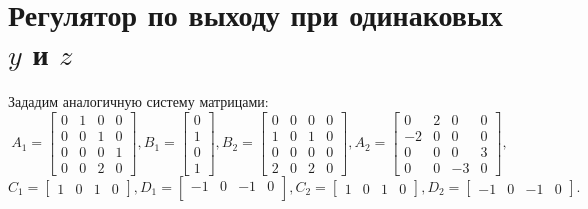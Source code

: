 \pagebreak

\section{Регулятор по выходу при одинаковых $y$ и $z$}

Зададим аналогичную систему матрицами:
\begin{equation*}
    A_1 = \begin{bmatrix}
        0 & 1 & 0 & 0 \\
        0 & 0 & 1 & 0 \\
        0 & 0 & 0 & 1 \\
        0 & 0 & 2 & 0
    \end{bmatrix}, 
    B_1 = \begin{bmatrix}
        0 \\ 1 \\ 0 \\ 1
    \end{bmatrix},
    B_2 = \begin{bmatrix}
        0 & 0 & 0 & 0 \\
        1 & 0 & 1 & 0 \\
        0 & 0 & 0 & 0 \\
        2 & 0 & 2 & 0
    \end{bmatrix}, 
    A_2 = \begin{bmatrix}
        0 & 2 & 0 & 0 \\
        -2 & 0 & 0 & 0 \\
        0 & 0 & 0 & 3 \\
        0 & 0 & -3 & 0
    \end{bmatrix}, 
\end{equation*}
\begin{equation*}
    C_1 = \begin{bmatrix}
        1 & 0 & 1 & 0
    \end{bmatrix},
    D_1 = \begin{bmatrix}
        -1 & 0 & -1 & 0 \\
    \end{bmatrix},
    C_2 = \begin{bmatrix}
        1 & 0 & 1 & 0
    \end{bmatrix},
    D_2 = \begin{bmatrix}
        -1 & 0 & -1 & 0
    \end{bmatrix}.
\end{equation*}

